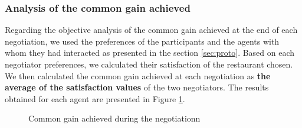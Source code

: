 \documentclass[10pt, a4paper, twocolumn]{article} %
\begin{document}
	\subsubsection{Analysis of the common gain achieved} 
	Regarding the objective analysis of the common gain achieved at the end of each negotiation, we used the preferences of the participants and the agents with whom they had interacted as presented in the section \ref{sec:proto}. 
	Based on each negotiator preferences, we calculated their satisfaction of the restaurant chosen. We then calculated the common gain achieved at each negotiation as \textbf{the average of the satisfaction values} of the two negotiators. The results obtained for each agent are presented in Figure \ref{fig:gain}. 
	
				\begin{figure}[h]
			
			
			\caption{Common gain achieved during the negotiationn}
			\label{fig:gain}
		\end{figure}
		
\end{document}
